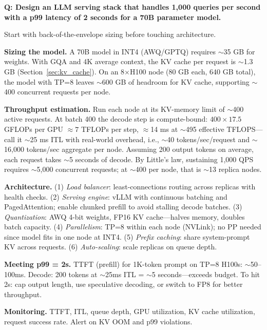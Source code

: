 \begin{interviewq}
\textbf{Q: Design an LLM serving stack that handles 1,000 queries per second with a p99 latency of 2 seconds for a 70B parameter model.}

 \quad {} \quad \badgefreq{\freqhigh}

\stronganswer

Start with back-of-the-envelope sizing before touching architecture.

\textbf{Sizing the model.} A 70B model in INT4 (AWQ/GPTQ) requires $\sim$35 GB for weights. With GQA and 4K average context, the KV cache per request is $\sim$1.3 GB (Section~\ref{sec:kv_cache}). On an 8$\times$H100 node (80 GB each, 640 GB total), the model with TP=8 leaves $\sim$600 GB of headroom for KV cache, supporting $\sim$400 concurrent requests per node.

\textbf{Throughput estimation.} Run each node at its KV-memory limit of $\sim$400 active requests. At batch 400 the decode step is compute-bound: $400 \times 17.5$ GFLOPs per GPU $\approx 7$ TFLOPs per step, $\approx$14 ms at $\sim$495 effective TFLOPS---call it $\sim$25 ms ITL with real-world overhead, i.e., $\sim$40 tokens/sec/request and $\sim$16{,}000 tokens/sec aggregate per node. Assuming 200 output tokens on average, each request takes $\sim$5 seconds of decode. By Little's law, sustaining 1,000 QPS requires $\sim$5,000 concurrent requests; at $\sim$400 per node, that is $\sim$13 replica nodes.

\textbf{Architecture.} (1) \textit{Load balancer}: least-connections routing across replicas with health checks. (2) \textit{Serving engine}: vLLM with continuous batching and PagedAttention; enable chunked prefill to avoid stalling decode batches. (3) \textit{Quantization}: AWQ 4-bit weights, FP16 KV cache---halves memory, doubles batch capacity. (4) \textit{Parallelism}: TP=8 within each node (NVLink); no PP needed since model fits in one node at INT4. (5) \textit{Prefix caching}: share system-prompt KV across requests. (6) \textit{Auto-scaling}: scale replicas on queue depth.

\textbf{Meeting p99 = 2s.} TTFT (prefill) for 1K-token prompt on TP=8 H100s: $\sim$50--100ms. Decode: 200 tokens at $\sim$25ms ITL = $\sim$5 seconds---exceeds budget. To hit 2s: cap output length, use speculative decoding, or switch to FP8 for better throughput.

\textbf{Monitoring.} TTFT, ITL, queue depth, GPU utilization, KV cache utilization, request success rate. Alert on KV OOM and p99 violations.


\end{interviewq}
